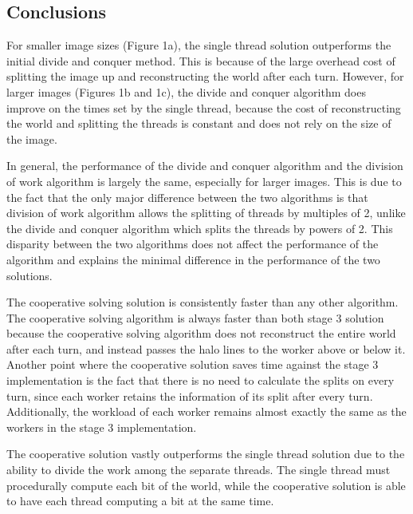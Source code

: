 \documentclass[10pt,a4paper,dvipsnames,cmyk]{scrartcl}
\begin{document}
\begin{samepage}
\subsection*{Conclusions}%
\label{sub:Conclusions}
For smaller image sizes (Figure 1a), the single thread solution
outperforms the initial divide and conquer method. This is because of the
large overhead cost of splitting the image up and reconstructing the world
after each turn.  However, for larger images (Figures 1b and 1c), the
divide and conquer algorithm does improve on the times set by the single
thread, because the cost of reconstructing the world and splitting the
threads is constant and does not rely on the size of the image.

In general, the performance of the divide and conquer algorithm and the
division of work algorithm is largely the same, especially for larger
images. This is due to the fact that the only major difference between the
two algorithms is that division of work algorithm allows the splitting of
threads by multiples of 2, unlike the divide and conquer algorithm which
splits the threads by powers of 2. This disparity between the two algorithms
does not affect the performance of the algorithm and explains the minimal
difference in the performance of the two solutions.

The cooperative solving solution is consistently faster than any other
algorithm. The cooperative solving algorithm is always faster than both
stage 3 solution because the cooperative solving algorithm does not
reconstruct the entire world after each turn, and instead passes the halo
lines to the worker above or below it. Another point where the cooperative
solution saves time against the stage 3 implementation is the fact that
there is no need to calculate the splits on every turn, since each worker
retains the information of its split after every turn. Additionally, the
workload of each worker remains almost exactly the same as the workers in
the stage 3 implementation.

The cooperative solution vastly outperforms the single thread solution due
to the ability to divide the work among the separate threads. The single
thread must procedurally compute each bit of the world, while the
cooperative solution is able to have each thread computing a bit at the
same time.
\end{samepage}
\end{document}
